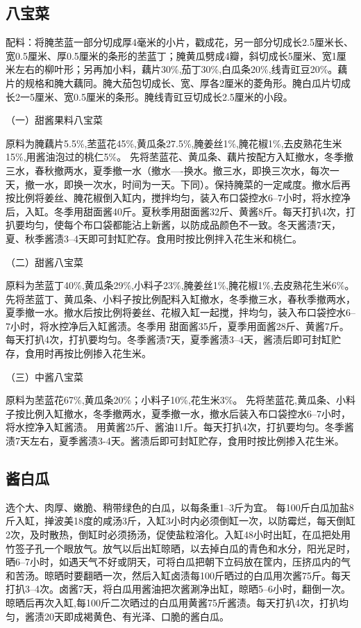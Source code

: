 \documentclass{ctexbook}
\begin{document}
\subsection{八宝菜}
配料：将腌苤蓝一部分切成厚4毫米的小片，戳成花，另一部分切成长2.5厘米长、宽0.5厘米、厚0.5厘米的条形的苤蓝丁；腌黄瓜劈成4瓣，斜切成长5厘米、宽1厘米左右的柳叶形；另再加小料，藕片30\%,茄丁30\%,白瓜条20\%,线青豇豆20\%。藕片的规格和腌大藕同。腌大茄包切成长、宽、厚各2厘米的菱角形。腌白瓜片切成长2一5厘米、宽0.5厘米的条形。腌线青豇豆切成长2.5厘米的小段。

（一）甜酱果料八宝菜

原料为腌藕片5.5\%,苤蓝花45\%,黄瓜条27.5\%,腌姜丝1\%,腌花椒1\%,去皮熟花生米15\%,用酱油泡过的桃仁5\%。
先将苤蓝花、黄瓜条、藕片按配方入缸撤水，冬季撤三水，春秋撤两水，夏季撤一水（撤水----换水。撤三水，即换三次水，每次一天，撤一水，即换一次水，时间为一天。下同）。保持腌菜的一定咸度。撤水后再按比例将姜丝、腌花椒倒入缸内，搅拌均匀，装入布口袋控水6--7小时，将水控净后，入缸。冬季用甜面酱40斤。夏秋季用甜面酱32斤、黄酱8斤。每天打扒4次，打扒要均匀，使每个布口袋都能沾上新酱，以防成品颜色不一致。冬天酱渍7天，夏、秋季酱渍3--4天即可封缸贮存。食用时按比例拌入花生米和桃仁。

（二）甜酱八宝菜

原料为苤蓝丁40\%,黄瓜条29\%,小料子23\%,腌姜丝1\%,腌花椒1\%,去皮熟花生米6\%。
先将苤蓝丁、黄瓜条、小料子按比例配料入缸撤水，冬季撤三水，春秋季撤两水，夏季撤一水。撤水后按比例将姜丝、花椒入缸一起搅，拌均匀，装入布口袋控水6--7小时，将水控净后入缸酱渍。冬季用
甜面酱35斤，夏季用面酱28斤、黄酱7斤。每天打扒4次，打扒要均匀。冬季酱渍7天，夏季酱渍3--4天，酱渍后即可封缸贮存，食用时再按比例掺入花生米。

（三）中酱八宝菜

原料为苤蓝花67\%,黄瓜条20\%；小料子10\%,花生米3\%。
先将苤蓝花,黄瓜条、小料子按比例入缸撤水，冬季撤两水，夏季撤一水，撤水后装入布口袋控水6--7小时，将水控净入缸酱渍。
用黄酱25斤、酱油11斤。每天打扒4次，打扒要均匀。冬季酱渍7天左右，夏季酱渍3-4天。酱渍后即可封缸贮存，食用时按比例掺入花生米。
\subsection{酱白瓜}
选个大、肉厚、嫩脆、稍带绿色的白瓜，以每条重1--3斤为宜。
每100斤白瓜加盐8斤入缸，掸波美18度的咸汤3斤，入缸3小时内必须倒缸一次，以防霉烂，每天倒缸2次，及时散热，倒缸时必须扬汤，促使盐粒溶化。入缸48小时出缸，在瓜把处用竹签子孔一个眼放气。放气以后出缸晾晒，以去掉白瓜的青色和水分，阳光足时，晒6--7小时，如遇天气不好或阴天，可将白瓜把朝下立码放在筐内，压挤瓜内的气和苦汤。晾晒时要翻晒一次，然后入缸卤渍每100斤晒过的白瓜用次酱75斤。每天打扒3--4次。卤酱7天，将白瓜用酱油把次酱涮净出缸，晾晒5--6小时，翻倒一次。晾晒后再次入缸,每100斤二次晒过的白瓜用黄酱75斤酱渍。每天打扒4次，打扒均匀，酱渍20天即成褐黄色、有光泽、口脆的酱白瓜。
\end{document}
